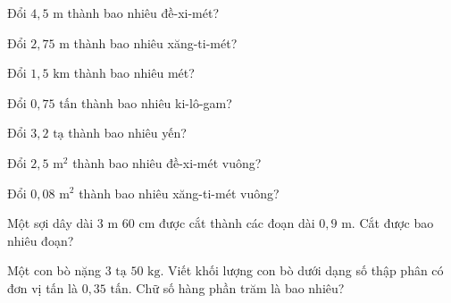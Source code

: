 \begin{ex}
  Đổi $4{,}5\text{ m}$ thành bao nhiêu đề-xi-mét?
\end{ex}

\begin{ex}
  Đổi $2{,}75\text{ m}$ thành bao nhiêu xăng-ti-mét?
\end{ex}

\begin{ex}
  Đổi $1{,}5\text{ km}$ thành bao nhiêu mét?
\end{ex}

\begin{ex}
  Đổi $0{,}75\text{ tấn}$ thành bao nhiêu ki-lô-gam?
\end{ex}

\begin{ex}
  Đổi $3{,}2\text{ tạ}$ thành bao nhiêu yến?
\end{ex}

\begin{ex}
  Đổi $2{,}5\text{ m}^2$ thành bao nhiêu đề-xi-mét vuông?
\end{ex}

\begin{ex}
  Đổi $0{,}08\text{ m}^2$ thành bao nhiêu xăng-ti-mét vuông?
\end{ex}

\begin{ex}
  Một sợi dây dài $3\text{ m } 60\text{ cm}$ được cắt thành các đoạn dài $0{,}9\text{ m}$. Cắt được bao nhiêu đoạn?
\end{ex}

\begin{ex}
  Một con bò nặng $3\text{ tạ } 50\text{ kg}$. Viết khối lượng con bò dưới dạng số thập phân có đơn vị tấn là $0{,}35\text{ tấn}$. Chữ số hàng phần trăm là bao nhiêu?
\end{ex}

